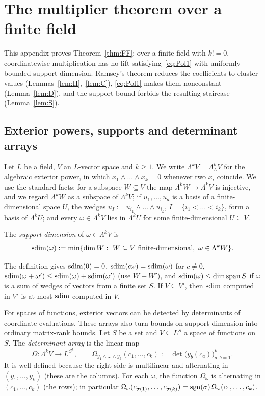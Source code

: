 \section{The multiplier theorem over a finite field}\label{app:FF}\label{sec:FF}

This appendix proves Theorem~\ref{thm:FF}: over a finite field with $k!=0$, coordinatewise multiplication has no lift
satisfying~\eqref{eq:Pol1} with uniformly bounded support dimension. Ramsey's theorem reduces the coefficients to
cluster values (Lemmas~\ref{lem:H},~\ref{lem:C}), \eqref{eq:Pol1} makes them nonconstant (Lemma~\ref{lem:D}), and the
support bound forbids the resulting staircase (Lemma~\ref{lem:S}).

\subsection{Exterior powers, supports and determinant arrays}\label{ssec:ext}
Let $L$ be a field, $V$ an $L$\nobreakdash-vector space and $k\ge1$. We write $\Lambda^kV=\Lambda^k_LV$ for the algebraic exterior
power, in which $x_1\wedge\dots\wedge x_k=0$ whenever two $x_i$ coincide. We use the standard facts: for a subspace
$W\subseteq V$ the map $\Lambda^kW\to\Lambda^kV$ is injective, and we regard $\Lambda^kW$ as a subspace of $\Lambda^kV$;
if $u_1,\dots,u_d$ is a basis of a finite-dimensional space $U$, the wedges $u_I:=u_{i_1}\wedge\dots\wedge u_{i_k}$,
$I=\{i_1<\dots<i_k\}$, form a basis of $\Lambda^kU$; and every $\omega\in\Lambda^kV$ lies in $\Lambda^kU$ for some
finite-dimensional $U\subseteq V$.

\begin{definition}\label{def:supp}
The \emph{support dimension} of $\omega\in\Lambda^kV$ is
\[
\operatorname{sdim}(\omega):=\min\{\dim W:\ W\subseteq V\text{ finite-dimensional},\ \omega\in\Lambda^kW\}.
\]
\end{definition}

The definition gives $\operatorname{sdim}(0)=0$, $\operatorname{sdim}(c\omega)=\operatorname{sdim}(\omega)$ for $c\neq0$, $\operatorname{sdim}(\omega+\omega')\le\operatorname{sdim}(\omega)+\operatorname{sdim}(\omega')$
(use $W+W'$), and $\operatorname{sdim}(\omega)\le\dim\operatorname{span} S$ if $\omega$ is a sum of wedges of vectors from a finite set $S$. If
$V\subseteq V'$, then $\operatorname{sdim}$ computed in $V'$ is at most $\operatorname{sdim}$ computed in $V$.

For spaces of functions, exterior vectors can be detected by determinants of coordinate evaluations. These arrays
also turn bounds on support dimension into ordinary matrix-rank bounds.
Let $S$ be a set and $V\subseteq L^S$ a space of functions on $S$. The \emph{determinant array} is the linear map
\[
\Omega\colon\Lambda^kV\to L^{S^k},\qquad \Omega_{y_1\wedge\dots\wedge y_k}(c_1,\dots,c_k):=\det\bigl(y_b(c_a)\bigr)_{a,b=1}^k .
\]
It is well defined because the right side is multilinear and alternating in $(y_1,\dots,y_k)$ (these are the
columns). For each $\omega$, the function $\Omega_\omega$ is alternating in $(c_1,\dots,c_k)$ (the rows); in particular
$\Omega_\omega(c_{\sigma(1)},\dots,c_{\sigma(k)})=\operatorname{sgn}(\sigma)\,\Omega_\omega(c_1,\dots,c_k)$.

